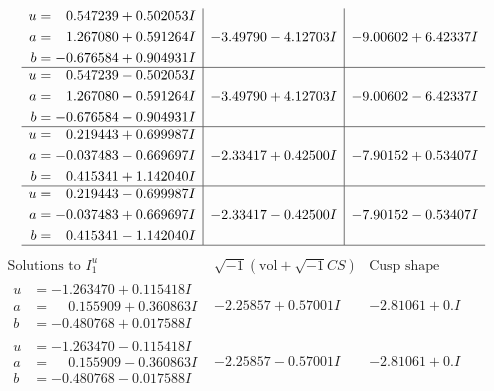 \documentclass[1p]{elsarticle_modified}
\theoremstyle{definition}
\newcommand{\I}{\sqrt{-1}}
\begin{document}
$$\begin{array}{c|c|c}
\begin{aligned}
u &= \phantom{-}0.547239 + 0.502053 I \\
a &= \phantom{-}1.267080 + 0.591264 I \\
b &= -0.676584 + 0.904931 I\end{aligned}
 & -3.49790 - 4.12703 I & -9.00602 + 6.42337 I \\ \hline\begin{aligned}
u &= \phantom{-}0.547239 - 0.502053 I \\
a &= \phantom{-}1.267080 - 0.591264 I \\
b &= -0.676584 - 0.904931 I\end{aligned}
 & -3.49790 + 4.12703 I & -9.00602 - 6.42337 I \\ \hline\begin{aligned}
u &= \phantom{-}0.219443 + 0.699987 I \\
a &= -0.037483 - 0.669697 I \\
b &= \phantom{-}0.415341 + 1.142040 I\end{aligned}
 & -2.33417 + 0.42500 I & -7.90152 + 0.53407 I \\ \hline\begin{aligned}
u &= \phantom{-}0.219443 - 0.699987 I \\
a &= -0.037483 + 0.669697 I \\
b &= \phantom{-}0.415341 - 1.142040 I\end{aligned}
 & -2.33417 - 0.42500 I & -7.90152 - 0.53407 I\\
 \hline 
 \end{array}$$\newpage$$\begin{array}{c|c|c}  
\text{Solutions to }I^u_{1}& \I (\text{vol} + \sqrt{-1}CS) & \text{Cusp shape}\\
 \hline 
\begin{aligned}
u &= -1.263470 + 0.115418 I \\
a &= \phantom{-}0.155909 + 0.360863 I \\
b &= -0.480768 + 0.017588 I\end{aligned}
 & -2.25857 + 0.57001 I & -2.81061 + 0. I\phantom{ +0.000000I} \\ \hline\begin{aligned}
u &= -1.263470 - 0.115418 I \\
a &= \phantom{-}0.155909 - 0.360863 I \\
b &= -0.480768 - 0.017588 I\end{aligned}
 & -2.25857 - 0.57001 I & -2.81061 + 0. I\phantom{ +0.000000I} \\ \hline\begin{aligned}

\end{aligned}
\end{array}$$
\end{document}
